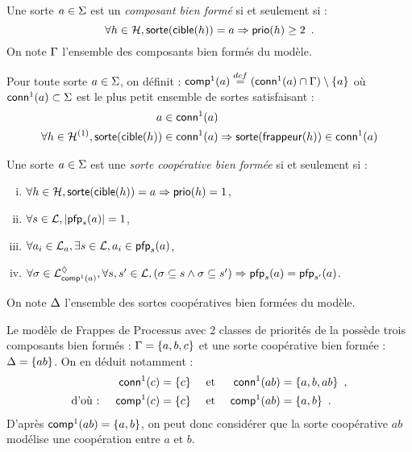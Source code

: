 \begin{definition}
  Une sorte $a \in \PHs$ est un \emph{composant bien formé} si et seulement si :
    \[\forall h \in \PHh, \PHsort(\target{h}) = a \Rightarrow \prio(h) \geq 2 \enspace.\]
  On note $\components$ l'ensemble des composants bien formés du modèle.
\end{definition}

\begin{definition}
  Pour toute sorte $a \in \PHs$, on définit :
  $\compin(a) \DEF (\conn(a) \cap \components) \setminus \{ a \}$ où
  $\conn(a) \subset \PHs$ est le plus petit ensemble de sortes satisfaisant :
  \begin{align*}
    a \in \conn(a) & \\
    \forall h \in \PHh^{(1)},
      \sort{\target{h}} \in \conn(a) & \Rightarrow \sort{\hitter{h}} \in \conn(a)
  \end{align*}
\end{definition}

\begin{definition}
  Une sorte $a \in \PHs$ est une \emph{sorte coopérative bien formée} si et seulement si :
  \begin{enumerate}[(i)]
    \item $\forall h \in \PHh, \sort{\target{h}} = a \Rightarrow \prio(h) = 1$,
    \item \label{csai} $\forall s \in \PHl, \card{\pfp_s(a)} = 1$,
    \item \label{css} $\forall a_i \in \PHl_a, \exists s \in \PHl, a_i \in \pfp_s(a)$,
    \item \label{csss} $\forall \mysigma \in \PHsubl[\PHl]_{\compin(a)}, \forall s, s' \in \PHl,
        (\mysigma \subseteq s \wedge \mysigma \subseteq s') \Rightarrow \pfp_s(a) = \pfp_{s'}(a)$.
  \end{enumerate}
  On note $\cs$ l'ensemble des sortes coopératives bien formées du modèle.
\end{definition}

\begin{example}
  Le modèle de Frappes de Processus avec 2 classes de priorités de la 
  possède trois composants bien formés : $\components = \{ a, b, c \}$
  et une sorte coopérative bien formée : $\cs = \{ ab \}$.
  On en déduit notamment :
  \begin{align*}
                   && \conn(c) &= \{ c \} &\text{ et } &&\conn(ab) &= \{ a, b, ab \} \enspace, \\
    \text{d'où : } && \compin(c) &= \{ c \} &\text{ et } &&\compin(ab) &= \{ a, b \} \enspace. \\
  \end{align*}
  D'après $\compin(ab) = \{ a, b \}$,
  on peut donc considérer que la sorte coopérative $ab$ modélise une coopération
  entre $a$ et $b$.
\end{example}

